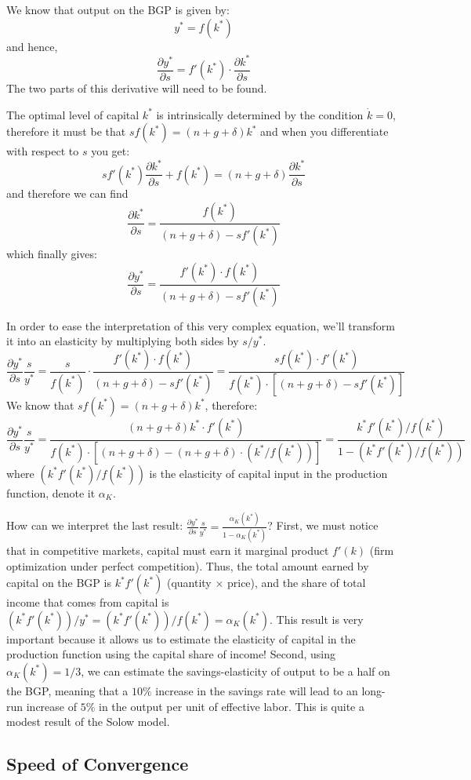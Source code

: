 \documentclass[12pt]{report}
\begin{document}
We know that output on the BGP is given by: $$y^* = f(k^*)$$ and hence, $$\frac{\partial y^*}{\partial s} = f'(k^*)\cdot \frac{\partial k^*}{\partial s} $$ The two parts of this derivative will need to be found.

The optimal level of capital $k^*$ is intrinsically determined by the condition $\dot{k} = 0$, therefore it must be that $sf(k^*) = (n+g+\delta)k^*$ and when you differentiate with respect to $s$ you get: $$sf'(k^*)\frac{\partial k^*}{\partial s} + f(k^*) = (n+g+\delta)\frac{\partial k^*}{\partial s} $$ and therefore we can find $$\frac{\partial k^*}{\partial s} = \frac{f(k^*)}{(n + g + \delta) - sf'(k^*)} $$ which finally gives: $$ \frac{\partial y^*}{\partial s} = \frac{f'(k^*)\cdot f(k^*)}{(n + g + \delta) - sf'(k^*)} $$

In order to ease the interpretation of this very complex equation, we'll transform it into an elasticity by multiplying both sides by $s/y^*$. $$\frac{\partial y^*}{\partial s}\frac{s}{y^*} = \frac{s}{f(k^*)}\cdot \frac{f'(k^*)\cdot f(k^*)}{(n + g + \delta) - sf'(k^*)} = \frac{sf(k^*)\cdot f'(k^*)}{f(k^*)\cdot[(n + g + \delta) - sf'(k^*)]} $$ We know that $sf(k^*) = (n+g+\delta)k^*$, therefore: $$ \frac{\partial y^*}{\partial s}\frac{s}{y^*} = \frac{(n+g+\delta)k^* \cdot f'(k^*)}{f(k^*)\cdot[(n + g + \delta) - (n + g + \delta)\cdot (k^*/f(k^*))]} = \frac{k^* f'(k^*)/f(k^*)}{1 - (k^*f'(k^*)/f(k^*))}$$ where $(k^*f'(k^*)/f(k^*))$ is the elasticity of capital input in the production function, denote it $\alpha_K$.

How can we interpret the last result: $\frac{\partial y^*}{\partial s}\frac{s}{y^*} = \frac{\alpha_K(k^*)}{1 - \alpha_K(k^*)}$? First, we must notice that in competitive markets, capital must earn it marginal product $f'(k)$ (firm optimization under perfect competition). Thus, the total amount earned by capital on the BGP is $k^*f'(k^*)$ (quantity $\times$ price), and the share of total income that comes from capital is $(k^*f'(k^*))/y^* = (k^*f'(k^*))/f(k^*) = \alpha_K(k^*)$. This result is very important because it allows us to estimate the elasticity of capital in the production function using the capital share of income! Second, using $\alpha_K(k^*) = 1/3$, we can estimate the savings-elasticity of output to be a half on the BGP, meaning that a $10\%$ increase in the savings rate will lead to an long-run increase of $5\%$ in the output per unit of effective labor. This is quite a modest result of the Solow model.

\subsection{Speed of Convergence}
\end{document}
